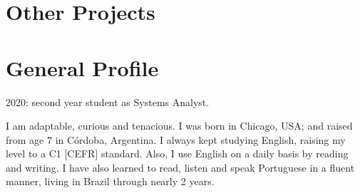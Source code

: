 

\section{Other Projects}

\begin{twenty} %

\end{twenty}

\section{General Profile} %


2020: second year student as Systems Analyst.

I am adaptable, curious and tenacious. 
I was born in Chicago, USA; and raised from age 7 in Córdoba, Argentina.
I always kept studying English, raising my level to a C1 [CEFR] standard.
Also, I use English on a daily basis by reading and writing. 
I have also learned to read, listen and speak Portuguese in a fluent manner, living in Brazil through nearly 2 years. 

